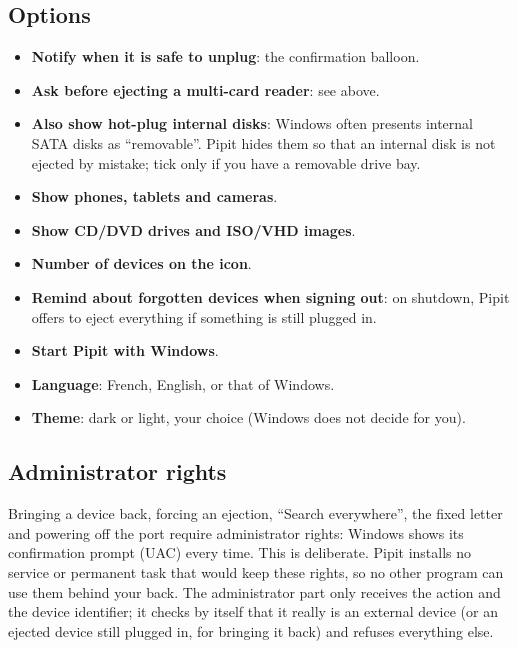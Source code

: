 \subsection{Options}
\begin{itemize}
\item \textbf{Notify when it is safe to unplug}: the confirmation balloon.
\item \textbf{Ask before ejecting a multi-card reader}: see above.
\item \textbf{Also show hot-plug internal disks}: Windows often presents internal SATA
  disks as “removable”. Pipit hides them so that an internal disk is not ejected by
  mistake; tick only if you have a removable drive bay.
\item \textbf{Show phones, tablets and cameras}.
\item \textbf{Show CD/DVD drives and ISO/VHD images}.
\item \textbf{Number of devices on the icon}.
\item \textbf{Remind about forgotten devices when signing out}: on shutdown, Pipit offers to
  eject everything if something is still plugged in.
\item \textbf{Start Pipit with Windows}.
\item \textbf{Language}: French, English, or that of Windows.
\item \textbf{Theme}: dark or light, your choice (Windows does not decide for you).
\end{itemize}

\subsection{Administrator rights}\label{sec:assistant}
Bringing a device back, forcing an ejection, “Search everywhere”, the fixed letter and powering off
the port require administrator
rights: Windows shows its confirmation prompt (UAC) every time. This is deliberate. Pipit
installs no service or permanent task that would keep these rights, so no other program can
use them behind your back. The administrator part only receives the action and the device
identifier; it checks by itself that it really is an external device (or an ejected device
still plugged in, for bringing it back) and refuses everything else.


